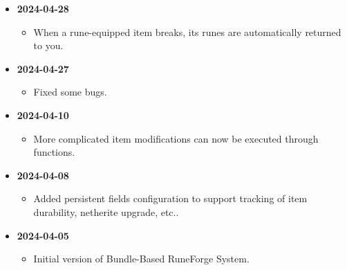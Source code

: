 \documentclass[11pt]{article}
\begin{document}
\begin{itemize}
  \item \textbf{2024-04-28}
    \begin{itemize}
      \item When a rune-equipped item breaks, its runes are automatically returned to you.
    \end{itemize}

  \item \textbf{2024-04-27}
    \begin{itemize}
      \item Fixed some bugs.
    \end{itemize}

  \item \textbf{2024-04-10}
    \begin{itemize}
      \item More complicated item modifications can now be executed through functions.
    \end{itemize}

  \item \textbf{2024-04-08}
    \begin{itemize}
      \item Added persistent fields configuration to support tracking of item durability, netherite upgrade, etc..
    \end{itemize}
  
  \item \textbf{2024-04-05}
    \begin{itemize}
      \item Initial version of Bundle-Based RuneForge System.
    \end{itemize}
\end{itemize}
\end{document}
